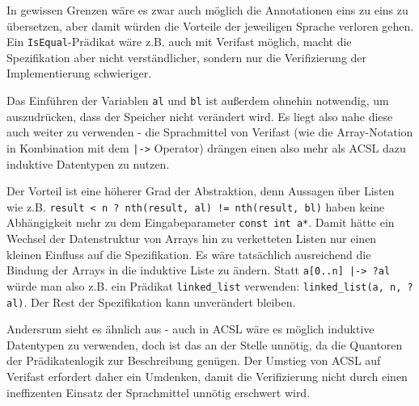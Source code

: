 In gewissen Grenzen wäre es zwar auch möglich die Annotationen eins zu eins zu übersetzen, aber damit
würden die Vorteile der jeweiligen Sprache verloren gehen. Ein \lstinline{IsEqual}-Prädikat wäre z.B.
auch mit Verifast möglich, macht die Spezifikation aber nicht verständlicher, sondern nur die Verifizierung
der Implementierung schwieriger. 

Das Einführen der Variablen  \lstinline{al} und \lstinline{bl} ist außerdem
ohnehin notwendig, um auszudrücken, dass der Speicher nicht verändert wird. Es liegt also nahe diese auch
weiter zu verwenden - die Sprachmittel von Verifast (wie die Array-Notation in Kombination mit dem
\lstinline{|->} Operator) drängen einen also mehr als ACSL dazu induktive 
Datentypen zu nutzen.

Der Vorteil ist eine höherer Grad der Abstraktion, denn Aussagen über Listen wie z.B.
\lstinline{result < n ? nth(result, al) != nth(result, bl)} haben keine Abhängigkeit mehr zu
dem Eingabeparameter \lstinline{const int a*}. Damit hätte ein Wechsel der Datenstruktur von Arrays
hin zu verketteten Listen nur einen kleinen Einfluss auf die Spezifikation. Es wäre tatsächlich ausreichend
die Bindung der Arrays in die induktive Liste zu ändern. Statt \lstinline{a[0..n] |-> ?al} würde man also
z.B. ein Prädikat \lstinline{linked_list} verwenden: \lstinline{linked_list(a, n, ?al)}.
Der Rest der Spezifikation kann unverändert bleiben.

Andersrum sieht es ähnlich aus - auch in ACSL wäre es möglich induktive Datentypen zu verwenden, doch
ist das an der Stelle unnötig, da die Quantoren der Prädikatenlogik zur Beschreibung genügen. Der Umstieg
von ACSL auf Verifast erfordert daher ein Umdenken, damit die Verifizierung nicht durch einen ineffizenten
Einsatz der Sprachmittel unnötig erschwert wird.

